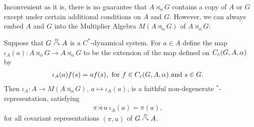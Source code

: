Inconvenient as it is, there is no guarantee that $A \rtimes_\alpha G$ contains a copy of $A$ or $G$ except under certain additional conditions on $A$ and $G$. However, we can always embed $A$ and $G$ into the Multiplier Algebra $M(A \rtimes_\alpha G)$ of $A \rtimes_\alpha G$:
\begin{lemma}
Suppose that $G \stackrel{\alpha}{\curvearrowright} A$ is a $C^*$-dynamical system. For $a \in A$ define the map $\iota_A(a) \colon A \rtimes_\alpha G \to A \rtimes_\alpha G$ to be the extension of the map defined on $C_c(G,A,\alpha)$ by
\begin{align*}
	\iota_A(a) f(s) = af(s), \text{ for } f \in C_c(G,A,\alpha) \text{ and } s \in G.
\end{align*}
Then $\iota_A \colon A \to M(A \rtimes_\alpha G)$, $a \mapsto \iota_A(a)$, is a faithful non-degenerate $^*$-representation, satisfying
\begin{align*}
	\overline{\pi \rtimes u } \ \iota_A(a) = \pi(a),
\end{align*}
for all covariant representations $(\pi,u)$ of $G \stackrel{\alpha}{\curvearrowright} A $.
\end{lemma}
